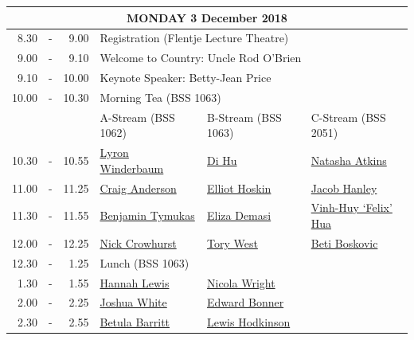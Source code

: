 \documentclass[twoside,12pt,a4paper,notitlepage]{memoir}
\begin{document}
\renewcommand{\arraystretch}{1.4}
\begin{center}
\begin{tabular}{rcr|p{3.6cm}|p{3.6cm}|p{3.6cm}}
\multicolumn{6}{c}{{\large MONDAY 3 December 2018}} \\ \hline
8.30 & - & 9.00 & \multicolumn{3}{l}{Registration (Flentje Lecture Theatre)} \\ \hline
9.00 & - & 9.10 & \multicolumn{3}{l}{Welcome to Country: Uncle Rod O'Brien} \\ \hline
9.10 & - & 10.00 & \multicolumn{3}{l}{Keynote Speaker: Betty-Jean Price} \\ \hline
10.00 & - & 10.30 & \multicolumn{3}{l}{Morning Tea (BSS 1063)} \\ \hline
 & & & A-Stream \hspace{1cm} (BSS 1062) & B-Stream \hspace{1cm} (BSS 1063) & C-Stream \hspace{1cm} (BSS 2051) \\ \hline
 10.30 & - & 10.55 & 
 \hyperref[aut:winderbaum]{Lyron Winderbaum} & 
 \hyperref[aut:hu]{Di Hu} &  
 \hyperref[aut:atkins]{Natasha Atkins} \\ \hline
11.00 & - & 11.25 &
 \hyperref[aut:anderson]{Craig Anderson} &
 \hyperref[aut:hoskin]{Elliot Hoskin} &
 \hyperref[aut:hanley]{Jacob Hanley} \\ \hline
11.30 & - & 11.55 &
 \hyperref[aut:tymukas]{Benjamin Tymukas} &
 \hyperref[aut:demasi]{Eliza Demasi} &
 \hyperref[aut:hua]{Vinh-Huy `Felix' Hua}  \\ \hline
12.00 & - & 12.25 &
\hyperref[aut:crowhurst]{Nick Crowhurst} &
 \hyperref[aut:west]{Tory West} &
 \hyperref[aut:boskovic]{Beti Boskovic} \\ \hline
12.30 & - & 1.25 & \multicolumn{3}{l}{Lunch (BSS 1063)} \\ \hline
1.30 & - & 1.55 &
 \hyperref[aut:lewis]{Hannah Lewis} &
 \hyperref[aut:wright]{Nicola Wright} &
 \\ \hline
2.00 & - & 2.25 &
 \hyperref[aut:white]{Joshua White} &
 \hyperref[aut:bonner]{Edward Bonner} &
 \\ \hline
2.30 & - & 2.55 &
 \hyperref[aut:barritt]{Betula Barritt} &
 \hyperref[aut:hodkinson]{Lewis Hodkinson} &
 \\ \hline
\end{tabular}
\end{center}
\vfill
\end{document}
